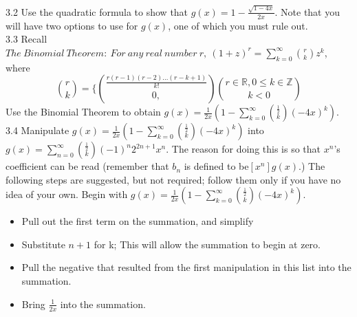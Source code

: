 \documentclass[10pt,a4paper]{report}
\begin{document}
	3.2 Use the quadratic formula to show that $g(x) = 1-\frac{\sqrt{1-4x}}{2x}$. Note that you will have two options to use for $g(x)$, one of which you must rule out.\\
	3.3 Recall $The\ Binomial\ Theorem:\ For\ any\ real\ number\ r,\ (1+z)^r = \sum_{k=0}^{\infty}\binom{r}{k}z^k$, where 
	\[\binom{r}{k} = \lbrace \binom{\frac{r(r-1)(r-2)...(r-k+1)}{k!}}{0,}\binom{r\in\mathbb{R},0\leq k\in\mathbb{Z}}{k<0}\]
	Use the Binomial Theorem to obtain $g(x) = \frac{1}{2x}(1-\sum_{k=0}^{\infty}\binom{\frac{1}{2}}{k}(-4x)^k)$.\\
	3.4 Manipulate $g(x) = \frac{1}{2x}(1-\sum_{k=0}^{\infty}\binom{\frac{1}{2}}{k}(-4x)^k)$ into $g(x) = \sum_{n=0}^{\infty}\binom{\frac{1}{2}}{k}(-1)^n2^{2n+1}x^n$.  The reason for doing this is so that $x^n$'s coefficient can be read (remember that $b_n$ is defined to be$ [x^n]g(x)$.)  The following steps are suggested, but not required; follow them only if you have no idea of your own.  Begin with $g(x) = \frac{1}{2x}(1-\sum_{k=0}^{\infty}\binom{\frac{1}{2}}{k}(-4x)^k)$.\\
	\begin{itemize}
		\item Pull out the first term on the summation,  and simplify
		\item Substitute $n+1$ for k;  This will allow the summation to begin at zero.
		\item Pull the negative that resulted from the first manipulation in this list into the summation. 
		\item Bring $\frac{1}{2x}$ into the summation.
	\end{itemize}
	
\end{document}
